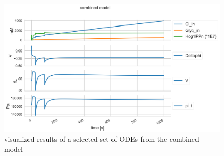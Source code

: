 \begin{figure}[h!]
	\begin{center}
		\begin{minipage}{0,85\textwidth}
			
			\includegraphics[width=\textwidth]{picture/combined_models_71.png}
			\caption{visualized results of a selected set of ODEs from the combined model} 
			\label{SingleDose} 
		\end{minipage}
	\end{center}
\end{figure}

